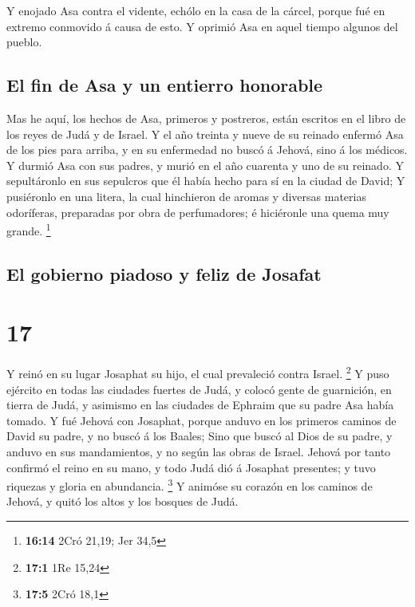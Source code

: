  Y enojado Asa contra el vidente, echólo en la casa de la
cárcel, porque fué en extremo conmovido á causa de esto. Y oprimió Asa
en aquel tiempo algunos del pueblo.

\hypertarget{el-fin-de-asa-y-un-entierro-honorable}{%
\subsection{El fin de Asa y un entierro
honorable}\label{el-fin-de-asa-y-un-entierro-honorable}}

 Mas he aquí, los hechos de Asa, primeros y postreros,
están escritos en el libro de los reyes de Judá y de Israel.
 Y el año treinta y nueve de su reinado enfermó Asa de los
pies para arriba, y en su enfermedad no buscó á Jehová, sino á los
médicos.  Y durmió Asa con sus padres, y murió en el año
cuarenta y uno de su reinado.  Y sepultáronlo en sus
sepulcros que él había hecho para sí en la ciudad de David; Y pusiéronlo
en una litera, la cual hinchieron de aromas y diversas materias
odoríferas, preparadas por obra de perfumadores; é hiciéronle una quema
muy grande. \footnote{\textbf{16:14} 2Cró 21,19; Jer 34,5}

\hypertarget{el-gobierno-piadoso-y-feliz-de-josafat}{%
\subsection{El gobierno piadoso y feliz de
Josafat}\label{el-gobierno-piadoso-y-feliz-de-josafat}}

\hypertarget{section-16}{%
\section{17}\label{section-16}}

 Y reinó en su lugar Josaphat su hijo, el cual prevaleció
contra Israel. \footnote{\textbf{17:1} 1Re 15,24}  Y puso
ejército en todas las ciudades fuertes de Judá, y colocó gente de
guarnición, en tierra de Judá, y asimismo en las ciudades de Ephraim que
su padre Asa había tomado.  Y fué Jehová con Josaphat,
porque anduvo en los primeros caminos de David su padre, y no buscó á
los Baales;  Sino que buscó al Dios de su padre, y anduvo en
sus mandamientos, y no según las obras de Israel.  Jehová
por tanto confirmó el reino en su mano, y todo Judá dió á Josaphat
presentes; y tuvo riquezas y gloria en abundancia. \footnote{\textbf{17:5}
  2Cró 18,1}  Y animóse su corazón en los caminos de Jehová,
y quitó los altos y los bosques de Judá.

